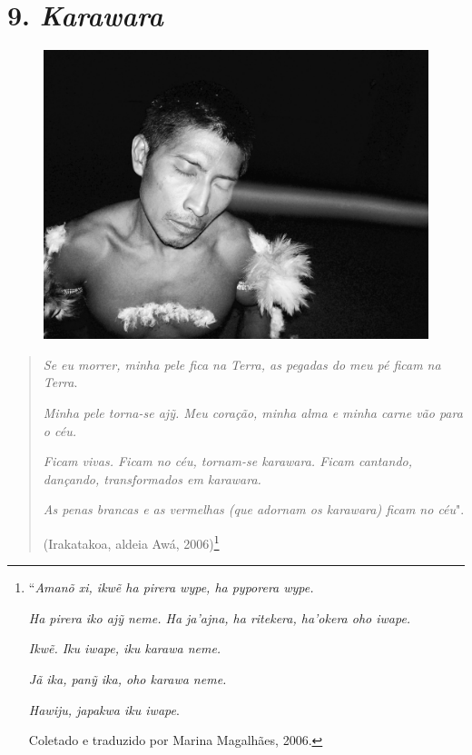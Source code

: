 
\chapter{9. \emph{Karawara}}\label{karawara}

\begin{figure}[H]
\centering
  \includegraphics[width=\textwidth]{./imgs/100_1752}
\end{figure}

\begin{quote}
\emph{Se eu morrer, minha pele fica na Terra, as pegadas do meu pé
ficam na Terra}.

\emph{Minha pele torna-se ajỹ. Meu coração, minha alma e minha carne vão
para o céu.}

\emph{Ficam vivas. Ficam no céu, tornam-se karawara. Ficam cantando,
dançando, transformados em karawara.}

\emph{As penas brancas e as vermelhas (que adornam os karawara) ficam no
céu}".

(Irakatakoa, aldeia Awá, 2006)\footnote{``\emph{Amanõ xi, ikwẽ ha pirera
  wype, ha pyporera wype.}

  \emph{Ha pirera iko ajỹ neme. Ha ja'ajna, ha ritekera, ha'okera oho
  iwape.}

  \emph{Ikwẽ. Iku iwape, iku karawa neme.}

  \emph{Jã ika, panỹ ika, oho karawa neme.}

  \emph{Hawiju, japakwa iku iwape}.

  Coletado e traduzido por Marina Magalhães, 2006.}
\end{quote}

